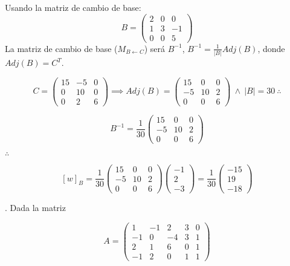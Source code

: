 \documentclass[12pt]{article}
\begin{document}
\bigskip
Usando la matriz de cambio de base:
\bigskip
$$B = \begin{pmatrix} 2 & 0 & 0 \\ 1 & 3 & -1\\ 0 & 0 & 5 \end{pmatrix}$$
\bigskip
La matriz de cambio de base ($M_{B \leftarrow C}$) será $B^{-1}$, $B^{-1} = \frac{1}{|B|}Adj(B)$, donde $Adj(B) = C^{T}$.
\bigskip

$$C = \begin{pmatrix} 15 & -5 & 0\\ 0 & 10 & 0\\ 0 & 2 & 6 \end{pmatrix} \implies Adj(B) = \begin{pmatrix} 15 & 0 & 0\\ -5 & 10 & 2\\ 0 & 0 & 6 \end{pmatrix} \ \land \ |B| = 30 \ \therefore$$

$$B^{-1} = \frac{1}{30}\begin{pmatrix} 15 & 0 & 0\\ -5 & 10 & 2\\ 0 & 0 & 6 \end{pmatrix}$$

$\therefore$

$$[w]_{B} = \frac{1}{30} \begin{pmatrix} 15 & 0 & 0\\ -5 & 10 & 2\\ 0 & 0 & 6 \end{pmatrix} \begin{pmatrix} -1\\ 2\\ -3 \end{pmatrix} = \frac{1}{30} \begin{pmatrix} -15\\ 19\\ -18 \end{pmatrix}
$$

\bigskip



. Dada la matriz

$$A = \begin{pmatrix}
    1 & -1 & 2 & 3 & 0 \\
    -1 & 0 & -4 & 3 & 1  \\
    2 & 1 & 6 & 0 & 1 \\
    -1 & 2 & 0 & 1 & 1
    \end{pmatrix}$$
    
\end{document}
